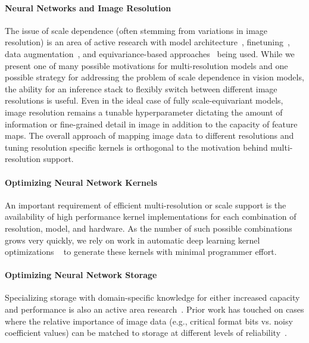 \paragraph{Neural Networks and Image Resolution}
The issue of scale dependence (often stemming from variations in image resolution) is an area of active research with model architecture~\cite{DBLP:journals/corr/KanazawaSJ14}, finetuning~\cite{touvron2019fixing}, data augmentation~\cite{hoffer2019mix}, and equivariance-based approaches~\cite{sosnovik2019scaleequivariant} being used.
While we present one of many possible motivations for multi-resolution models and one possible strategy for addressing the problem of scale dependence in vision models, the ability for an inference stack to flexibly switch between different image resolutions is useful.
Even in the ideal case of fully scale-equivariant models, image resolution remains a tunable hyperparameter dictating the amount of information or fine-grained detail in image in addition to the capacity of feature maps.
The overall approach of mapping image data to different resolutions and tuning resolution specific kernels is orthogonal to the motivation behind multi-resolution support.


\paragraph{Optimizing Neural Network Kernels}
An important requirement of efficient multi-resolution or scale support is the availability of high performance kernel implementations for each combination of resolution, model, and hardware.
As the number of such possible combinations grows very quickly, we rely on work in automatic deep learning kernel optimizations ~\cite{ragan2013halide, chen2018tvm, zheng2020ansor, cowan2020automatic} to generate these kernels with minimal programmer effort.

\paragraph{Optimizing Neural Network Storage}
Specializing storage with domain-specific knowledge for either increased capacity and performance is also an active area research~\cite{sampson2014approximate, jevdjic2017approximate, mazumdar2019vignette}.
Prior work has touched on cases where the relative importance of image data (e.g., critical format bits vs. noisy coefficient values) can be matched to storage at different levels of reliability~\cite{guo2016high, jevdjic2017approximate}.

